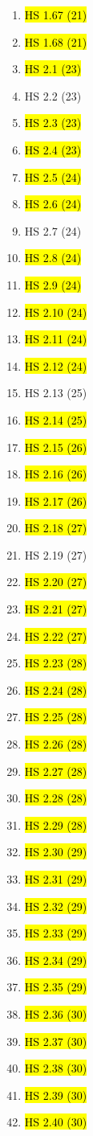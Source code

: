 \documentclass[11pt]{article}
\newenvironment{note}{\begin{enumerate}[leftmargin=1em,topsep=0pt,noitemsep]}{\end{enumerate}}
\begin{document}
\begin{spacing}{1.1}
\begin{note}
\item \hl{HS 1.67 (21)}
\item \hl{HS 1.68 (21)}
\item \hl{HS 2.1 (23)}
\item HS 2.2 (23)
\item \hl{HS 2.3 (23)}
\item \hl{HS 2.4 (23)}
\item \hl{HS 2.5 (24)}
\item \hl{HS 2.6 (24)}
\item HS 2.7 (24)
\item \hl{HS 2.8 (24)}
\item \hl{HS 2.9 (24)}
\item \hl{HS 2.10 (24)}
\item \hl{HS 2.11 (24)}
\item \hl{HS 2.12 (24)}
\item HS 2.13 (25)
\item \hl{HS 2.14 (25)}
\item \hl{HS 2.15 (26)}
\item \hl{HS 2.16 (26)}
\item \hl{HS 2.17 (26)}
\item \hl{HS 2.18 (27)}
\item HS 2.19 (27)
\item \hl{HS 2.20 (27)}
\item \hl{HS 2.21 (27)}
\item \hl{HS 2.22 (27)}
\item \hl{HS 2.23 (28)}
\item \hl{HS 2.24 (28)}
\item \hl{HS 2.25 (28)}
\item \hl{HS 2.26 (28)}
\item \hl{HS 2.27 (28)}
\item \hl{HS 2.28 (28)}
\item \hl{HS 2.29 (28)}
\item \hl{HS 2.30 (29)}
\item \hl{HS 2.31 (29)}
\item \hl{HS 2.32 (29)}
\item \hl{HS 2.33 (29)}
\item \hl{HS 2.34 (29)}
\item \hl{HS 2.35 (29)}
\item \hl{HS 2.36 (30)}
\item \hl{HS 2.37 (30)}
\item \hl{HS 2.38 (30)}
\item \hl{HS 2.39 (30)}
\item \hl{HS 2.40 (30)}

\end{note}
\end{spacing}
\end{document}
